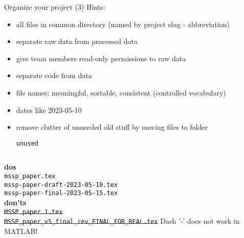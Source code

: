 \documentclass[10pt,aspectratio=169,notes]{beamer} %
\begin{document}
\begin{frame}[t,label=frame11]{Organize your project (3)}
Hints:
\begin{itemize}
	\item all files in common directory (named by project slug - abbreviation) 
	\item separate raw data from processed data
	\item give team members read-only permissions to raw data
	\item separate code from data
	\item file names: meaningful, sortable, consistent (controlled vocabulary)
	\item dates like 2023-05-10
	\item remove clutter of unneeded old stuff by moving files to folder 
	\texttt{unused}
\end{itemize}	
\begin{columns}[T]
	\hspace{5mm}
	\textbf{dos}\\
	\texttt{mssp\_paper.tex}\\
	\texttt{mssp-paper-draft-2023-05-10.tex}\\
	\texttt{mssp-paper-final-2023-05-15.tex}\\
	\textbf{don'ts}\\
	\sout{\texttt{MSSP paper 1.tex}}\\
	\sout{\texttt{MSSP\_paper\_v5\_final\_rev\_FINAL\_FOR\_REAL.tex}}
	\alert{Dash '-' does not work in MATLAB!}
\end{columns}

\end{frame}
\end{document}
